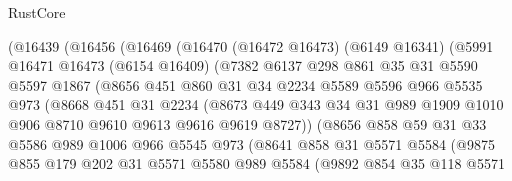 \begin{lexlean}{RustCore}
\begin{coremodule}
            (@16439
              (@16456
                (@16469
                  (@16470
                    (@16472 @16473)
                    (@6149 @16341)
                    (@5991
                      @16471
                      @16473
                      (@6154 @16409)
                      (@7382
                        @6137
                        @298
                        @861
                        @35
                        @31
                        @5590
                        @5597
                        @1867
                        (@8656
                          @451
                          @860
                          @31
                          @34
                          @2234
                          @5589
                          @5596
                          @966
                          @5535
                          @973
                          (@8668
                            @451
                            @31
                            @2234
                            (@8673
                              @449
                              @343
                              @34
                              @31
                              @989
                              @1909
                              @1010
                              @906
                              @8710
                              @9610
                              @9613
                              @9616
                              @9619
                              @8727))
                          (@8656
                            @858
                            @59
                            @31
                            @33
                            @5586
                            @989
                            @1006
                            @966
                            @5545
                            @973
                            (@8641
                              @858
                              @31
                              @5571
                              @5584
                              (@9875
                                @855
                                @179
                                @202
                                @31
                                @5571
                                @5580
                                @989
                                @5584
                                (@9892
                                  @854
                                  @35
                                  @118
                                  @5571

\end{coremodule}
\end{lexlean}
